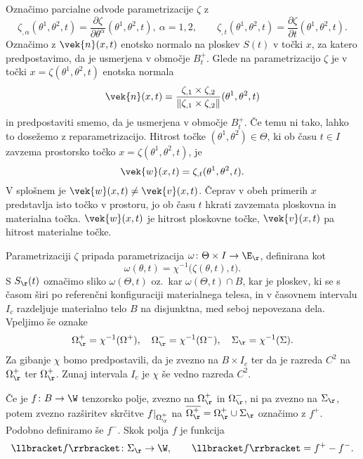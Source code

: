 Označimo parcialne odvode parametrizacije $\zeta$ z
\[
	\zeta_{,\alpha}(\theta^1,\theta^2,t)=\frac{\partial\zeta}{\partial\theta^{\alpha}}(\theta^1,\theta^2,t),\ \alpha=1,2,\qquad
	\zeta_{,t}(\theta^1,\theta^2,t)=\frac{\partial\zeta}{\partial t}(\theta^1,\theta^2,t).
\]
Označimo z $\vek{n}(x,t)$ enotsko normalo na ploskev $S(t)$ v točki $x$, za katero predpostavimo,
da je usmerjena v območje $B_t^+$. Glede na parametrizacijo $\zeta$ je v točki $x=\zeta(\theta^1,\theta^2,t)$
enotska normala
\[
	\vek{n}(x,t)=
	\frac{\zeta_{,1}\times\zeta_{,2}}{\displaystyle\left\| \zeta_{,1}\times\zeta_{,2} \right\|}(\theta^1,\theta^2,t)
\]
in predpostaviti smemo, da je usmerjena v območje $B_t^+$. Če temu ni tako, lahko to
dosežemo z reparametrizacijo. Hitrost točke $(\theta^1,\theta^2)\in\Theta$, ki
ob času $t\in I$ zavzema prostorsko točko $x=\zeta(\theta^1,\theta^2,t)$, je
\[
	\vek{w}(x,t)=\zeta_{,t}(\theta^1,\theta^2,t).
\] 
V splošnem je $\vek{w}(x,t)\neq\vek{v}(x,t)$. Čeprav v obeh primerih $x$ predstavlja isto točko
v prostoru, jo ob času $t$ hkrati zavzemata ploskovna in materialna točka.
$\vek{w}(x,t)$ je hitrost ploskovne točke, $\vek{v}(x,t)$ pa hitrost materialne točke.

Parametrizaciji $\zeta$ pripada parametrizacija $\omega\colon\Theta\times I\to\E_{\r}$, definirana kot
\[ \omega(\theta,t)=\chi^{-1}\big(\zeta(\theta,t),t\big). \]
S $S_{\r}(t)$ označimo sliko $\omega(\Theta, t)$ oz.~kar $\omega(\Theta, t)\cap B$, kar
je ploskev, ki se s časom širi po referenčni konfiguraciji materialnega telesa, in
v časovnem intervalu $I_c$ razdeljuje materialno telo $B$ na disjunktna, med seboj nepovezana
dela. Vpeljimo še oznake
\[ \Omega_{\r}^+=\chi^{-1}(\Omega^+),\quad\Omega_{\r}^-=\chi^{-1}(\Omega^-),\quad\Sigma_{\r}=\chi^{-1}(\Sigma). \]
Za gibanje $\chi$ bomo predpostavili, da je zvezno na $B\times I_c$ ter da je razreda $C^2$ na $\Omega_{\r}^+$
ter $\Omega_{\r}^+$. \textcolor[rgb]{1,0,0}{Zunaj intervala $I_c$ je $\chi$ še vedno razreda $C^2$.}

Če je $f\colon B\to\W$ tenzorsko polje, zvezno na $\Omega_{\r}^+$ in $\Omega_{\r}^-$, ni pa zvezno na
$\Sigma_{\r}$, potem zvezno razširitev skrčitve $f|_{\Omega_{\r}^+}$ na $\overline{\Omega_{\r}^+}=\Omega_{\r}^+\cup\Sigma_{\r}$
označimo z $f^+$. Podobno definiramo še $f^-$. Skok polja $f$ je funkcija
\[ \llbracket f\rrbracket\colon\Sigma_{\r}\to\W,\qquad \llbracket f\rrbracket=f^+-f^-. \]

